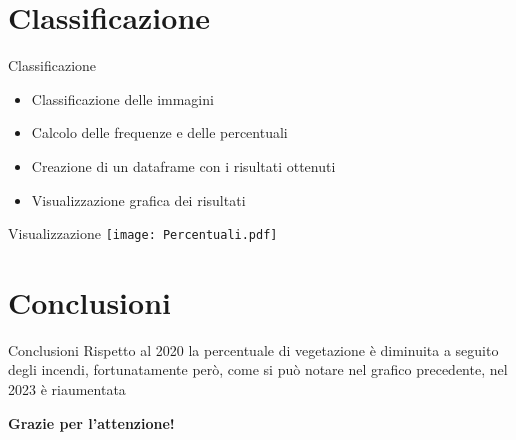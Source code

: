 \documentclass{beamer}
\begin{document}
\section{Classificazione}

\begin{frame}{Classificazione}
\begin{itemize}
    \item Classificazione delle immagini
    \item \pause Calcolo delle frequenze e delle percentuali
    \item \pause Creazione di un dataframe con i risultati ottenuti
    \item \pause Visualizzazione grafica dei risultati
\end{itemize}
\end{frame}

\begin{frame}{Visualizzazione}
    \texttt{[image: Percentuali.pdf]}
\end{frame}

\section{Conclusioni}

\begin{frame}{Conclusioni}
Rispetto al 2020 la percentuale di vegetazione è diminuita a seguito degli incendi, fortunatamente però, come si può notare nel grafico precedente, nel 2023 è riaumentata
\end{frame}

\begin{frame}{}
    \centering \textbf{Grazie per l'attenzione!}
\end{frame}
\end{document}
